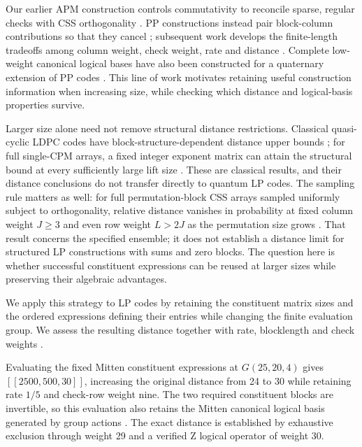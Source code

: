 \documentclass[12pt]{article}
\begin{document}
Our earlier APM construction controls commutativity to reconcile sparse,
regular checks with CSS orthogonality \cite{barrier}. PP constructions
instead pair block-column contributions so that they cancel
\cite{pp}; subsequent work develops the finite-length tradeoffs among
column weight, check weight, rate and distance \cite{design}.
Complete low-weight canonical logical bases have also been constructed
for a quaternary extension of PP codes \cite{ppbasis}. This line of work
motivates retaining useful construction information when increasing size,
while checking which distance and logical-basis properties survive.

Larger size alone need not remove structural distance restrictions.
Classical quasi-cyclic LDPC codes have block-structure-dependent distance
upper bounds \cite{qcbound}; for full single-CPM arrays, a fixed integer
exponent matrix can attain the structural bound at every sufficiently
large lift size \cite{cpmattain}. These are classical results, and their
distance conclusions do not transfer directly to quantum LP codes.
The sampling rule matters as well: for full permutation-block CSS arrays
sampled uniformly subject to orthogonality, relative distance vanishes
in probability at fixed column weight $J\geq 3$ and even row weight
$L>2J$ as the permutation size grows \cite{randomcss}.
That result concerns the specified ensemble; it does not establish a
distance limit for structured LP constructions with sums and zero blocks.
The question here is whether successful constituent expressions can be
reused at larger sizes while preserving their algebraic advantages.

We apply this strategy to LP codes by retaining the constituent matrix
sizes and the ordered expressions defining their entries while changing
the finite evaluation group. We assess the resulting distance together
with rate, blocklength and check weights \cite{design}.

Evaluating the fixed Mitten constituent expressions at $G(25,20,4)$ gives
$[[2500,500,30]]$, increasing the original distance from 24 to 30 while
retaining rate $1/5$ and check-row weight nine. The two required
constituent blocks are invertible, so this evaluation also retains the
Mitten canonical logical basis generated by group actions
\cite[Definition~4 and Theorem~1]{mitten}.
The exact distance is established by exhaustive exclusion through weight 29
and a verified Z logical operator of weight 30.
\end{document}
